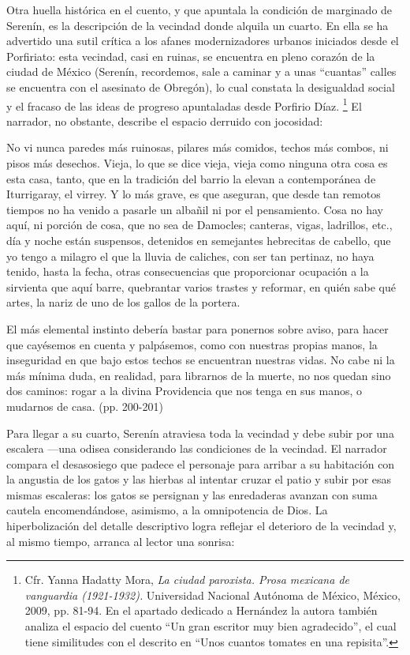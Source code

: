 \documentclass[14pt,twoside,final]{extbook} %
\let\oldfootnote\footnote
\renewcommand\footnote[1]{%
\oldfootnote{\hspace{1mm}#1}}
\begin{document}
Otra huella histórica en el cuento, y que apuntala la condición de marginado de Serenín, es la descripción de la vecindad donde alquila un cuarto. En ella se ha advertido una sutil crítica a los afanes modernizadores urbanos iniciados desde el Porfiriato: esta vecindad, casi en ruinas, se encuentra en pleno corazón de la ciudad de México (Serenín, recordemos, sale a caminar y a unas ``cuantas'' calles se encuentra con el asesinato de Obregón), lo cual constata la desigualdad social y el fracaso de las ideas de progreso apuntaladas desde Porfirio Díaz.\footnote{Cfr. Yanna Hadatty Mora, \emph{La ciudad paroxista. Prosa mexicana de vanguardia (1921-1932).} Universidad Nacional Autónoma de México, México, 2009, pp. 81-94. En el apartado dedicado a Hernández la autora también analiza el espacio del cuento ``Un gran escritor muy bien agradecido'', el cual tiene similitudes con el descrito en ``Unos cuantos tomates en una repisita''.} El narrador, no obstante, describe el espacio derruido con jocosidad:
\begin{quoting}
No vi nunca paredes más ruinosas, pilares más comidos, techos más combos, ni pisos más desechos. Vieja, lo que se dice vieja, vieja como ninguna otra cosa es esta casa, tanto, que en la tradición del barrio la elevan a contemporánea de Iturrigaray, el virrey. Y lo más grave, es que aseguran, que desde tan remotos tiempos no ha venido a pasarle un albañil ni por el pensamiento. Cosa no hay aquí, ni porción de cosa, que no sea de Damocles; canteras, vigas, ladrillos, etc., día y noche están suspensos, detenidos en semejantes hebrecitas de cabello, que yo tengo a milagro el que la lluvia de caliches, con ser tan pertinaz, no haya tenido, hasta la fecha, otras consecuencias que proporcionar ocupación a la sirvienta que aquí barre, quebrantar varios trastes y reformar, en quién sabe qué artes, la nariz de uno de los gallos de la portera.

El más elemental instinto debería bastar para ponernos sobre aviso, para hacer que cayésemos en cuenta y palpásemos, como con nuestras propias manos, la inseguridad en que bajo estos techos se encuentran nuestras vidas. No cabe ni la más mínima duda, en realidad, para librarnos de la muerte, no nos quedan sino dos caminos: rogar a la divina Providencia que nos tenga en sus manos, o mudarnos de casa. (pp. 200-201)
\end{quoting}
Para llegar a su cuarto, Serenín atraviesa toda la vecindad y debe subir por una escalera ---una odisea considerando las condiciones de la vecindad. El narrador compara el desasosiego que padece el personaje para arribar a su habitación con la angustia de los gatos y las hierbas al intentar cruzar el patio y subir por esas mismas escaleras: los gatos se persignan y las enredaderas avanzan con suma cautela encomendándose, asimismo, a la omnipotencia de Dios. La hiperbolización del detalle descriptivo logra reflejar el deterioro de la vecindad y, al mismo tiempo, arranca al lector una sonrisa:
\end{document}
